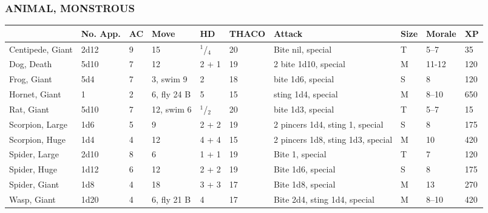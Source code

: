 \noindent \begin{minipage}{\columnwidth}

\vspace{1em}

\subsubsection{ANIMAL, MONSTROUS}

\noindent\begin{tabular}{p{}p{}p{}p{}p{}p{}p{}p{}p{}p{}}
  & \textbf{No. App.}	& \textbf{AC}	& \textbf{Move}	& \textbf{HD}	& \textbf{THACO}	& \textbf{Attack}	& \textbf{Size}	&\textbf{Morale} & \textbf{XP} \\ 
\hline
\rowcolor[gray]{.9}Centipede, Giant	& 2d12	& 9	& 15	& $^1$/$_4$	& 20	& Bite nil, special		& T	& 5--7	& 35	\\
Dog, Death			& 5d10	& 7	& 12	& 2 + 1		& 19	& 2 bite 1d10, special	& M	& 11-12	& 120	\\
\rowcolor[gray]{.9}Frog, Giant	& 5d4	& 7	& 3, swim 9	& 2	& 18	& bite 1d6, special	& S	& 8	& 120	\\ %
Hornet, Giant	& 1	& 2	& 6, fly 24 B	& 5	& 15	& sting 1d4, special	& M	& 8--10	& 650	\\
\rowcolor[gray]{.9}Rat, Giant	& 5d10	& 7	& 12, swim 6	& $^1$/$_2$	& 20	& bite 1d3, special	& T	& 5--7	& 15	\\ 
Scorpion, Large	& 1d6	& 5	& 9		& 2 + 2	& 19	& 2 pincers 1d4, sting 1, special	& S	& 8	& 175	\\
\rowcolor[gray]{.9}Scorpion, Huge	& 1d4	& 4	& 12	& 4 + 4	& 15	& 2 pincers 1d8, sting 1d3, special	& M	& 10	& 420	\\
Spider, Large	& 2d10	& 8	& 6		& 1 + 1	& 19	& Bite 1, special	& T	& 7	& 120	\\ %
\rowcolor[gray]{.9}Spider, Huge	& 1d12	& 6	& 12	& 2 + 2	& 19	& Bite 1d6, special	& S	& 8	& 175	\\ %
Spider, Giant	& 1d8	& 4	& 18		& 3 + 3	& 17	& Bite 1d8, special	& M	& 13	& 270	\\ %
\rowcolor[gray]{.9}Wasp, Giant	& 1d20	& 4	& 6, fly 21 B	& 4	& 17	& Bite 2d4, sting 1d4, special	& M	& 8--10	& 420	\\ 
\end{tabular}

\end{minipage}	

